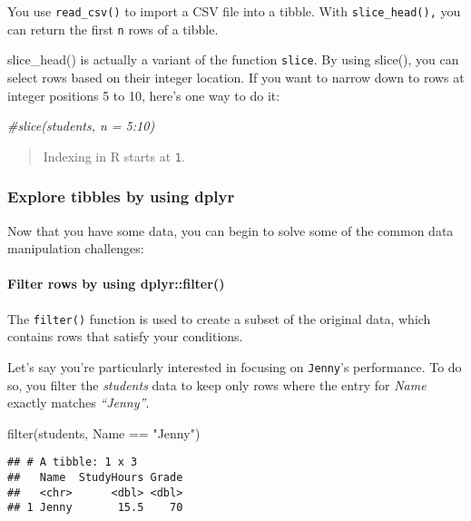 \documentclass[
]{article}
\newenvironment{Shaded}{\begin{snugshade}}{\end{snugshade}}
\newcommand{\CommentTok}[1]{\textcolor[rgb]{0.56,0.35,0.01}{\textit{#1}}}
\newcommand{\FunctionTok}[1]{\textcolor[rgb]{0.00,0.00,0.00}{#1}}
\newcommand{\NormalTok}[1]{#1}
\newcommand{\SpecialCharTok}[1]{\textcolor[rgb]{0.00,0.00,0.00}{#1}}
\newcommand{\StringTok}[1]{\textcolor[rgb]{0.31,0.60,0.02}{#1}}
\begin{document}
You use \texttt{read\_csv()} to import a CSV file into a tibble. With
\texttt{slice\_head(),} you can return the first \texttt{n} rows of a
tibble.

slice\_head() is actually a variant of the function \texttt{slice}. By
using slice(), you can select rows based on their integer location. If
you want to narrow down to rows at integer positions 5 to 10, here's one
way to do it:

\begin{Shaded}
\begin{Highlighting}[]
\CommentTok{\#slice(students, n = 5:10)}
\end{Highlighting}
\end{Shaded}

\begin{quote}
Indexing in R starts at \texttt{1}.
\end{quote}

\hypertarget{explore-tibbles-by-using-dplyr}{%
\subsubsection{Explore tibbles by using
dplyr}\label{explore-tibbles-by-using-dplyr}}

Now that you have some data, you can begin to solve some of the common
data manipulation challenges:

\hypertarget{filter-rows-by-using-dplyrfilter}{%
\paragraph{Filter rows by using
dplyr::filter()}\label{filter-rows-by-using-dplyrfilter}}

The \texttt{filter()} function is used to create a subset of the
original data, which contains rows that satisfy your conditions.

Let's say you're particularly interested in focusing on \texttt{Jenny}'s
performance. To do so, you filter the \emph{students} data to keep only
rows where the entry for \emph{Name} exactly matches \emph{``Jenny''}.

\begin{Shaded}
\begin{Highlighting}[]
\FunctionTok{filter}\NormalTok{(students, Name }\SpecialCharTok{==} \StringTok{"Jenny"}\NormalTok{)}
\end{Highlighting}
\end{Shaded}

\begin{verbatim}
## # A tibble: 1 x 3
##   Name  StudyHours Grade
##   <chr>      <dbl> <dbl>
## 1 Jenny       15.5    70
\end{verbatim}
\end{document}
